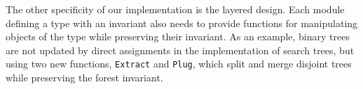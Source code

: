 \documentclass{llncs}
\begin{document}


The other specificity of our implementation is the layered design. Each module
defining a type with an invariant also needs to provide functions for
manipulating objects of the type while preserving their invariant. As an example,
binary trees are not updated by direct assignments in the implementation of search
trees, but using two new functions, \texttt{Extract} and
\texttt{Plug}, which split and merge disjoint trees while preserving the forest invariant.

% 
\end{document}
